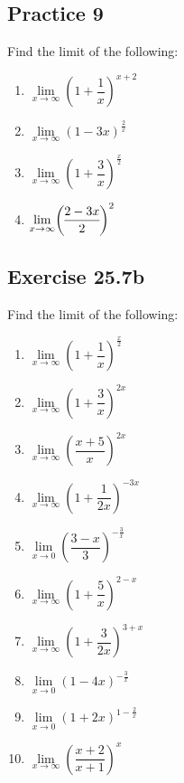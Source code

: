 \documentclass[12pt]{report}
\begin{document}
\subsection{Practice 9}

Find the limit of the following: \setlength{\columnseprule}{1pt}
\setlength{\columnsep}{24pt}
\begin{multicols}{2}
  \begin{enumerate}
    \item $\lim\limits_{x\to\infty}{\left(1+{\dfrac{1}{x}}\right)}^{x+2}$
    \item $\lim\limits_{x\to\infty}{\left(1-3x\right)}^{\frac{2}{x}}$
    \item $\lim\limits_{x\to\infty}{\left(1+\dfrac{3}{x}\right)}^{\frac{x}{2}}$
    \item $\lim\limits_{x\to\infty}\biggl{(\dfrac{2-3x}{2}\biggr)}^{2}$
  \end{enumerate}
\end{multicols}

\subsection{Exercise 25.7b}

Find the limit of the following: \setlength{\columnseprule}{1pt}
\setlength{\columnsep}{24pt}
\begin{multicols}{2}
  \begin{enumerate}
    \item $\lim\limits_{x\to\infty}{\left(1+\dfrac{1}{x}\right)}^{\frac{x}{2}}$
    \item $\lim\limits_{x\to\infty}{\left(1+\dfrac{3}{x}\right)}^{2x}$
    \item $\lim\limits_{x\to\infty}{\left({\dfrac{x+5}{x}}\right)}^{2x}$
    \item $\lim\limits_{x\to\infty}{\left(1+{\dfrac{1}{2x}}\right)}^{-3x}$
    \item $\lim\limits_{x\to0}{\left({\dfrac{3-x}{3}}\right)}^{-{\frac{3}{x}}}$
    \item $\lim\limits_{x\to\infty}{\left(1+{\dfrac{5}{x}}\right)}^{2-x}$
    \item $\lim\limits_{x\to\infty}{\left(1+\dfrac{3}{2x}\right)}^{3+x}$
    \item $\lim\limits_{x\to0}{\left(1-4x\right)}^{-\frac{3}{x}}$
    \item $\lim\limits_{x\to0}{\left(1+2x\right)}^{1-\frac{2}{x}}$
    \item $\lim\limits_{x\to\infty}{\left({\dfrac{x+2}{x+1}}\right)}^{x}$
  \end{enumerate}
\end{multicols}
\end{document}
